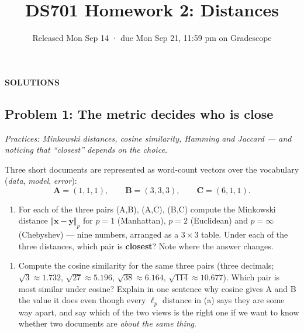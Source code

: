 \documentclass[
  11pt,
]{article}
\title{DS701 Homework 2: Distances}
\subtitle{Released Mon Sep 14 · due Mon Sep 21, 11:59 pm on Gradescope}
\author{}
\date{}
\providecommand{\tightlist}{%
  \setlength{\itemsep}{0pt}\setlength{\parskip}{0pt}}
\newcommand{\answerspace}[1]{\par\vspace*{#1}}  %
\newcommand{\answerpage}{\clearpage}
\begin{document}
\maketitle


\begin{center}\LARGE\bfseries\color{blue!45!black} SOLUTIONS\end{center}
\renewcommand{\answerspace}[1]{}
\renewcommand{\answerpage}{\par\vspace{6pt}}

\subsection{Problem 1: The metric decides who is
close}\label{problem-1-the-metric-decides-who-is-close}

\emph{Practices: Minkowski distances, cosine similarity, Hamming and
Jaccard --- and noticing that ``closest'' depends on the choice.}

Three short documents are represented as word-count vectors over the
vocabulary (\emph{data}, \emph{model}, \emph{error}):
\[\mathbf{A} = (1, 1, 1),\qquad \mathbf{B} = (3, 3, 3),\qquad \mathbf{C} = (6, 1, 1).\]

\begin{enumerate}
\def\labelenumi{(\alph{enumi})}
\tightlist
\item
  For each of the three pairs (A,B), (A,C), (B,C) compute the Minkowski
  distance \(\Vert\mathbf{x}-\mathbf{y}\Vert_p\) for \(p = 1\)
  (Manhattan), \(p = 2\) (Euclidean) and \(p = \infty\) (Chebyshev) ---
  nine numbers, arranged as a \(3\times3\) table. Under each of the
  three distances, which pair is \textbf{closest}? Note where the answer
  changes.
\end{enumerate}

\begin{enumerate}
\def\labelenumi{(\alph{enumi})}
\setcounter{enumi}{1}
\tightlist
\item
  Compute the cosine similarity for the same three pairs (three
  decimals; \(\sqrt{3}\approx1.732\), \(\sqrt{27}\approx5.196\),
  \(\sqrt{38}\approx6.164\), \(\sqrt{114}\approx10.677\)). Which pair is
  most similar under cosine? Explain in one sentence why cosine gives A
  and B the value it does even though every \(\ell_p\) distance in (a)
  says they are some way apart, and say which of the two views is the
  right one if we want to know whether two documents are \emph{about the
  same thing}.
\end{enumerate}
\end{document}
